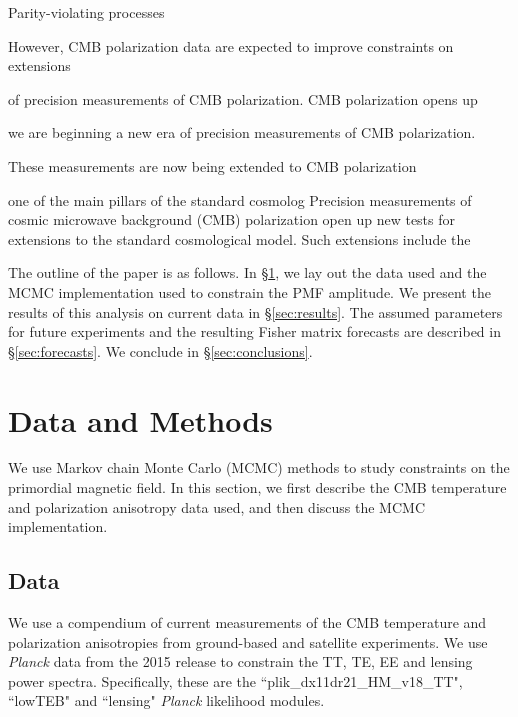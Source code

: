 \documentclass[preprint]{emulateapj}
\newcommand{\planck}{{\sl Planck}}
\begin{document}
Parity-violating processes 



However, CMB polarization data are expected to improve constraints on extensions


of precision measurements of CMB polarization. 
CMB polarization opens up 

we are beginning a new era of precision measurements of CMB polarization. 


These measurements are now being extended to CMB polarization

one of the main pillars of the standard cosmolog
Precision measurements of cosmic microwave background (CMB) polarization open up new tests for extensions to the  standard cosmological model. 
Such extensions include the 


The outline of the paper is as follows. 
In \S\ref{sec:data}, we lay out the data used and the MCMC implementation used to constrain the PMF amplitude. 
We present the results of this analysis on current data in \S\ref{sec:results}. 
The assumed parameters for future experiments and the resulting Fisher matrix forecasts are described in \S\ref{sec:forecasts}. 
We conclude in \S\ref{sec:conclusions}. 

\section{Data and Methods}
\label{sec:data}

We use  Markov chain Monte Carlo (MCMC) methods to study constraints on the primordial magnetic field. 
In this section, we first describe the CMB temperature and polarization anisotropy data used, and then discuss the MCMC implementation. 




\subsection{Data}

We use a compendium of current measurements of the CMB temperature and polarization anisotropies from ground-based and satellite experiments. 
We use \planck{} data from the 2015 release to constrain the TT, TE, EE and lensing power spectra. 
Specifically, these are the ``plik\_dx11dr21\_HM\_v18\_TT", ``lowTEB" and ``lensing" \planck{} likelihood modules. 
\end{document}
